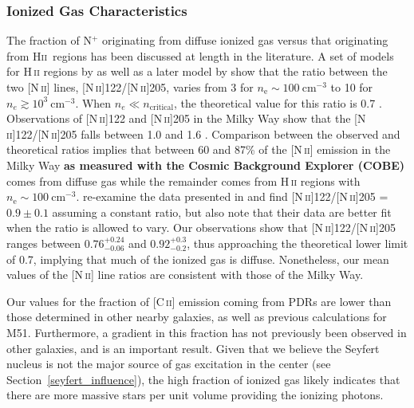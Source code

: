 \documentclass[preprint2]{aastex}
\begin{document}
\subsubsection{Ionized Gas Characteristics}
The fraction of N$^{+}$ originating from diffuse ionized gas versus that originating from H\textsc{ii}~regions has been discussed at length in the literature.  A set of models for H\,\textsc{ii} regions by \citet{1985ApJS...57..349R} as well as a later model by \citet{1994ApJ...420..772R} show that the ratio between the two [N\,\textsc{ii}] lines, [N\,\textsc{ii}]122/[N\,\textsc{ii}]205, varies from 3 for $n_{\mathrm{e}} \sim 100~\mathrm{cm}^{-3}$ to 10 for $n_{e} \gtrsim 10^{3}~\mathrm{cm}^{-3}$.  When $n_{e} \ll n_{\mathrm{critical}}$, the theoretical value for this ratio is 0.7 \citep{1991ApJ...381..200W,1994ApJ...434..587B}.  Observations of [N\,\textsc{ii}]122 and [N\,\textsc{ii}]205 in the Milky Way show that the [N\,\textsc{ii}]122/[N\,\textsc{ii}]205 falls between 1.0 and 1.6 \citep{1991ApJ...381..200W}.  Comparison between the observed and theoretical ratios implies that between 60 and 87\% of the [N\,\textsc{ii}] emission in the Milky Way \textbf{as measured with the Cosmic Background Explorer (COBE)} comes from diffuse gas while the remainder comes from H\,\textsc{ii} regions with $n_{\mathrm{e}} \sim 100~\mathrm{cm}^{-3}$.  \citet{1994ApJ...434..587B} re-examine the data presented in \citet{1991ApJ...381..200W} and find [N\,\textsc{ii}]122/[N\,\textsc{ii}]205 = $0.9 \pm 0.1$ assuming a constant ratio, but also note that their data are better fit when the ratio is allowed to vary.  Our observations show that [N\,\textsc{ii}]122/[N\,\textsc{ii}]205 ranges between $0.76^{+0.24}_{-0.06}$ and $0.92^{+0.3}_{-0.2}$, thus approaching the theoretical lower limit of 0.7, implying that much of the ionized gas is diffuse.  Nonetheless, our mean values of the [N\,\textsc{ii}] line ratios are consistent with those of the Milky Way.

Our values for the fraction of [C\,\textsc{ii}] emission coming from PDRs are lower than those determined in other nearby galaxies, as well as previous calculations for M51.  Furthermore, a gradient in this fraction has not previously been observed in other galaxies, and is an important result.  Given that we believe the Seyfert nucleus is not the major source of gas excitation in the center (see Section~\ref{seyfert_influence}), the high fraction of ionized gas likely indicates that there are more massive stars per unit volume providing the ionizing photons.
\end{document}
